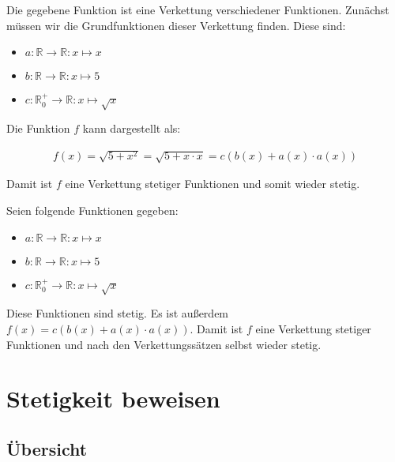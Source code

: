 \documentclass[fontsize=9pt,
               parskip=half-,
               DIV=14,
               listof=chapterentry,
               tocflat]{scrbook}
\begin{document}
\begin{solutionprocess*}
Die gegebene Funktion ist eine Verkettung verschiedener Funktionen. Zunächst müssen wir die Grundfunktionen dieser Verkettung finden. Diese sind:

\begin{itemize}
\item $a:\mathbb {R} \to \mathbb {R} :x\mapsto x$
\item $b:\mathbb {R} \to \mathbb {R} :x\mapsto 5$
\item $c:\mathbb {R} _{0}^{+}\to \mathbb {R} :x\mapsto {\sqrt {x}}$
\end{itemize}

Die Funktion $f$ kann dargestellt als:

\begin{align*}
f(x)={\sqrt {5+x^{2}}}={\sqrt {5+x\cdot x}}=c(b(x)+a(x)\cdot a(x))
\end{align*}

Damit ist $f$ eine Verkettung stetiger Funktionen und somit wieder stetig.

\end{solutionprocess*}

\begin{proof*}
Seien folgende Funktionen gegeben:

\begin{itemize}
\item $a:\mathbb {R} \to \mathbb {R} :x\mapsto x$
\item $b:\mathbb {R} \to \mathbb {R} :x\mapsto 5$
\item $c:\mathbb {R} _{0}^{+}\to \mathbb {R} :x\mapsto {\sqrt {x}}$
\end{itemize}

Diese Funktionen sind stetig. Es ist außerdem $f(x)=c(b(x)+a(x)\cdot a(x))$. Damit ist $f$ eine Verkettung stetiger Funktionen und nach den Verkettungssätzen selbst wieder stetig.

\end{proof*}



\chapter{Stetigkeit beweisen}

\section{Übersicht}
\end{document}
